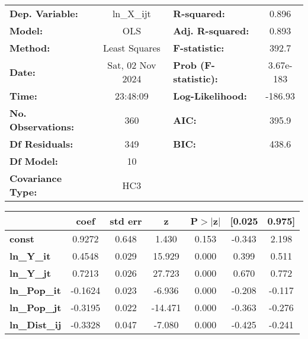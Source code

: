 \begin{center}
\begin{tabular}{lclc}
\toprule
\textbf{Dep. Variable:}    &    ln\_X\_ijt    & \textbf{  R-squared:         } &     0.896   \\
\textbf{Model:}            &       OLS        & \textbf{  Adj. R-squared:    } &     0.893   \\
\textbf{Method:}           &  Least Squares   & \textbf{  F-statistic:       } &     392.7   \\
\textbf{Date:}             & Sat, 02 Nov 2024 & \textbf{  Prob (F-statistic):} & 3.67e-183   \\
\textbf{Time:}             &     23:48:09     & \textbf{  Log-Likelihood:    } &   -186.93   \\
\textbf{No. Observations:} &         360      & \textbf{  AIC:               } &     395.9   \\
\textbf{Df Residuals:}     &         349      & \textbf{  BIC:               } &     438.6   \\
\textbf{Df Model:}         &          10      & \textbf{                     } &             \\
\textbf{Covariance Type:}  &       HC3        & \textbf{                     } &             \\
\bottomrule
\end{tabular}
\begin{tabular}{lcccccc}
                      & \textbf{coef} & \textbf{std err} & \textbf{z} & \textbf{P$> |$z$|$} & \textbf{[0.025} & \textbf{0.975]}  \\
\midrule
\textbf{const}        &       0.9272  &        0.648     &     1.430  &         0.153        &       -0.343    &        2.198     \\
\textbf{ln\_Y\_it}    &       0.4548  &        0.029     &    15.929  &         0.000        &        0.399    &        0.511     \\
\textbf{ln\_Y\_jt}    &       0.7213  &        0.026     &    27.723  &         0.000        &        0.670    &        0.772     \\
\textbf{ln\_Pop\_it}  &      -0.1624  &        0.023     &    -6.936  &         0.000        &       -0.208    &       -0.117     \\
\textbf{ln\_Pop\_jt}  &      -0.3195  &        0.022     &   -14.471  &         0.000        &       -0.363    &       -0.276     \\
\textbf{ln\_Dist\_ij} &      -0.3328  &        0.047     &    -7.080  &         0.000        &       -0.425    &       -0.241     \\

\end{tabular}
\end{center}

